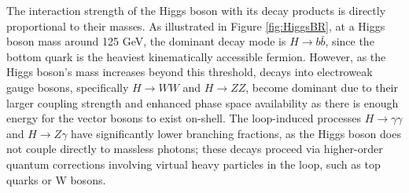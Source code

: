 
The interaction strength of the Higgs boson with its decay products is directly proportional to their masses. As illustrated in Figure \ref{fig:HiggsBR}, at a Higgs boson mass around 125 GeV, the dominant decay mode is \( H \to b\bar{b} \), since the bottom quark is the heaviest kinematically accessible fermion. However, as the Higgs boson's mass increases beyond this threshold, decays into electroweak gauge bosons, specifically \( H \to WW \) and \( H \to ZZ \), become dominant due to their larger coupling strength and enhanced phase space availability as there is enough energy for the vector bosons to exist on-shell. The loop-induced processes \( H \to \gamma\gamma \) and \( H \to Z\gamma \) have significantly lower branching fractions, as the Higgs boson does not couple directly to massless photons; these decays proceed via higher-order quantum corrections involving virtual heavy particles in the loop, such as top quarks or W bosons.

